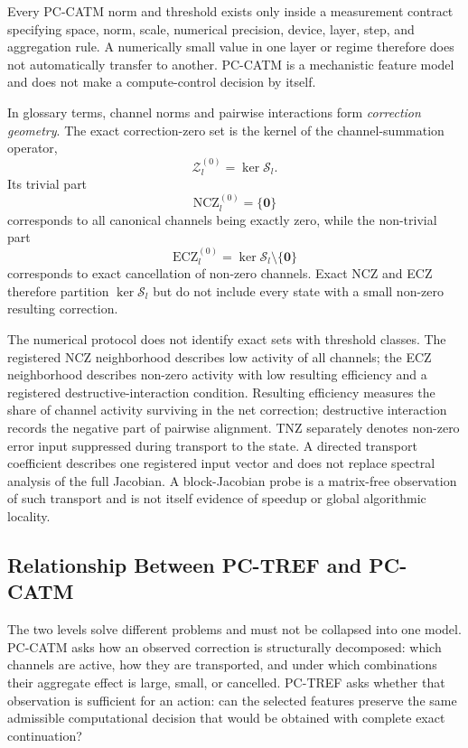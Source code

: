 Every PC-CATM norm and threshold exists only inside a measurement contract specifying
space, norm, scale, numerical precision, device, layer, step, and aggregation rule. A
numerically small value in one layer or regime therefore does not automatically transfer
to another. PC-CATM is a mechanistic feature model and does not make a compute-control
decision by itself.

In glossary terms, channel norms and pairwise interactions form \emph{correction
geometry}. The exact correction-zero set is the kernel of the channel-summation
operator,
\[
  \mathcal Z_l^{(0)}=\ker\mathcal S_l.
\]
Its trivial part
\[
  \mathrm{NCZ}_l^{(0)}=\{\mathbf0\}
\]
corresponds to all canonical channels being exactly zero, while the non-trivial part
\[
  \mathrm{ECZ}_l^{(0)}=\ker\mathcal S_l\setminus\{\mathbf0\}
\]
corresponds to exact cancellation of non-zero channels. Exact NCZ and ECZ therefore
partition $\ker\mathcal S_l$ but do not include every state with a small non-zero
resulting correction.

The numerical protocol does not identify exact sets with threshold classes. The
registered NCZ neighborhood describes low activity of all channels; the ECZ
neighborhood describes non-zero activity with low resulting efficiency and a
registered destructive-interaction condition. Resulting efficiency measures the share
of channel activity surviving in the net correction; destructive interaction records
the negative part of pairwise alignment. TNZ separately denotes non-zero error input
suppressed during transport to the state. A directed transport coefficient describes
one registered input vector and does not replace spectral analysis of the full Jacobian.
A block-Jacobian probe is a matrix-free observation of such transport and is not itself
evidence of speedup or global algorithmic locality.

\subsection{Relationship Between PC-TREF and PC-CATM}
\label{sec:theory-tref-catm-link}

The two levels solve different problems and must not be collapsed into one model.
PC-CATM asks how an observed correction is structurally decomposed: which channels are
active, how they are transported, and under which combinations their aggregate effect
is large, small, or cancelled. PC-TREF asks whether that observation is sufficient for
an action: can the selected features preserve the same admissible computational
decision that would be obtained with complete exact continuation?

